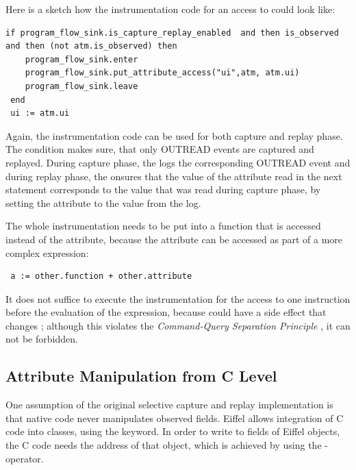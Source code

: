 Here is a sketch how the instrumentation code for an access to  could look like:
\begin{lstlisting}[caption=Instrumentation of an Attribute Access]
 if program_flow_sink.is_capture_replay_enabled  and then is_observed and then (not atm.is_observed) then
	program_flow_sink.enter
	program_flow_sink.put_attribute_access("ui",atm, atm.ui)
	program_flow_sink.leave
 end
 ui := atm.ui
\end{lstlisting}
Again, the instrumentation code can be used for both capture and replay phase. The condition makes sure, that only OUTREAD events are captured and replayed. During capture phase, the  logs the corresponding OUTREAD event and during replay phase, the  onsures that the value of the attribute read in the next statement corresponds to the value that was read during capture phase, by setting the attribute to the value from the log.

The whole instrumentation needs to be put into a function that is accessed instead of the attribute, because the attribute can be accessed as part of a more complex expression:
\begin{lstlisting}
 a := other.function + other.attribute
\end{lstlisting}
It does not suffice to execute the instrumentation for the access to  one instruction before the evaluation of the expression, because  could have a side effect that changes ; although this violates the \emph{Command-Query Separation Principle} \cite{oosc2}, it can not be forbidden.


\subsection{Attribute Manipulation from C Level}
One assumption of the original selective capture and replay implementation is that native code never manipulates observed fields. Eiffel allows integration of C code into classes, using the  keyword. In order to write to fields of Eiffel objects, the C code needs the address of that object, which is achieved by using the \identifier{\$} - operator.


